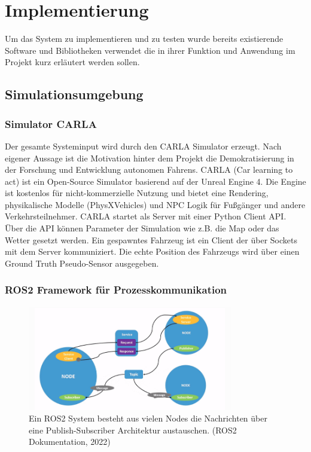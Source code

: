 \chapter{Implementierung}
\label{ch:implementierung}

Um das System zu implementieren und zu testen wurde bereits existierende Software und Bibliotheken verwendet die in ihrer Funktion und Anwendung im Projekt kurz erläutert werden sollen.


\section{Simulationsumgebung}
\subsection{Simulator CARLA}
Der gesamte Systeminput wird durch den CARLA Simulator\cite{Dosovitskiy17} erzeugt. Nach eigener Aussage ist die Motivation hinter dem Projekt die Demokratisierung in der Forschung und Entwicklung autonomen Fahrens. CARLA (Car learning to act) ist ein Open-Source Simulator basierend auf der Unreal Engine 4. Die Engine ist kostenlos für nicht-kommerzielle Nutzung und bietet eine Rendering, physikalische Modelle (PhysXVehicles) und NPC Logik für Fu{\ss}gänger und andere Verkehrsteilnehmer. CARLA startet als Server mit einer Python Client API. Über die API können Parameter der Simulation wie z.B. die Map oder das Wetter gesetzt werden. Ein gespawntes Fahrzeug ist ein Client der über Sockets mit dem Server kommuniziert. Die echte Position des Fahrzeugs wird über einen Ground Truth Pseudo-Sensor ausgegeben.


\subsection{ROS2 Framework für Prozesskommunikation}

\begin{figure}[h!]
	\centering
	\includegraphics[width=0.8\textwidth]{pictures/06_ROS_nodes.png}
	\caption[ROS2 Node Netzwerk]{Ein ROS2 System besteht aus vielen Nodes die Nachrichten über eine Publish-Subscriber Architektur austauschen. (ROS2 Dokumentation, 2022)}
\end{figure}


